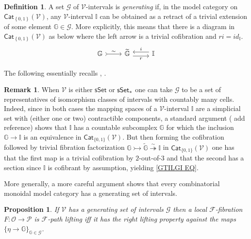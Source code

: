\documentclass[a4paper,10pt
,draft
]{article}%
\numberwithin{equation}{section}
\numberwithin{figure}{section}
\newtheorem{proposition}[equation]{Proposition}%
\theoremstyle{definition} %
\newtheorem{definition}[equation]{Definition}%
\newtheorem{remark}[equation]{Remark}%
\newcommand{\set}[1]{\left\{#1\right\}}%
\newcommand{\Cat}{\mathsf{Cat}}
\newcommand{\F}{\ensuremath{\mathcal F}}
\newcommand{\V}{\ensuremath{\mathcal V}}
\renewcommand{\O}{\ensuremath{\mathcal O}}
\renewcommand{\P}{\ensuremath{\mathcal P}}
\newcommand{\1}{\ensuremath{\mathbbm 1}}%
\begin{document}
\begin{definition}
	A set $\mathscr{G}$ of $\V$-intervals is \textit{generating} if,
	in the model category on $\Cat_{\set{0,1}}(\V)$,
	any $\V$-interval $\mathbb{I}$ can be obtained
	as a retract of a trivial extension of some element
	$\mathbb{G} \in \mathscr{G}$.
	More explicitly, this means that there is a diagram in 
	$\Cat_{\set{0,1}}(\V)$ as below
	where the left arrow is a trivial cofibration and
	$ri = id_{\mathbb{I}}$.
\begin{equation}\label{GTILGI EQ}
	\begin{tikzcd}
		\mathbb{G} \arrow[r,rightarrowtail, "\sim"]
	&
		\widetilde{\mathbb{G}} \arrow[r,yshift=-.3em, "r"']
	&
		\mathbb{I} \arrow[l,yshift=.3em, "i"']
	\end{tikzcd}
\end{equation}
\end{definition}


The following essentially recalls \cite[1.20]{CM13b}, \cite[\S 4.3]{Cav}.


\begin{remark}
When $\V$ is either $\mathsf{sSet}$ or $\mathsf{sSet}_{\**}$
one can take $\mathscr{G}$ to be a set of representatives of isomorphism classes of intervals with countably many cells.
Indeed, since in both cases the mapping spaces of a $\V$-interval
$\mathbb{I}$ are a simplicial set with (either one or two) contractible components,
a standard argument ({\color{red} add reference})
shows that $\mathbb{I}$ has a countable subcomplex 
$\mathbb{G}$ for which the inclusion 
$\mathbb{G} \to \mathbb{I}$
is an equivalence in $\mathsf{Cat}_{\{0,1\}}(\V)$.
But then forming the cofibration followed by trivial fibration factorization
$\mathbb{G} \rightarrowtail \widetilde{\mathbb{G}}
\overset{\sim}{\twoheadrightarrow} \mathbb{I}$
in $\mathsf{Cat}_{\{0,1\}}(\V)$
one has that the first map is a trivial cofibration by $2$-out-of-$3$
and that the second has a section since $\mathbb{I}$ is cofibrant by assumption, yielding \eqref{GTILGI EQ}.

More generally, a more careful argument \cite[Lemma 1.12]{BM13}
shows that every combinatorial monoidal model category
has a generating set of intervals.
\end{remark}




\begin{proposition}\label{GENIN PROP}
If $\V$ has a generating set of intervals $\mathscr{G}$ then a local $\F$-fibration $F \colon \O \to \P$ is $\F$-path lifting iff it has the right lifting property against the maps 
$\{\eta \to \mathbb{G}\}_{\mathbb{G}\in \mathscr{G}}$.
\end{proposition}
\end{document}
